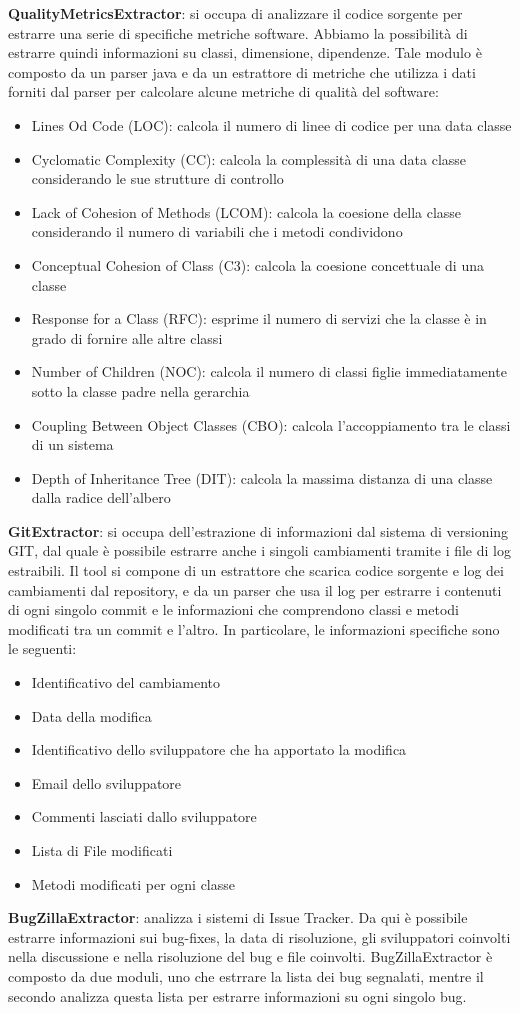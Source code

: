 \textbf{QualityMetricsExtractor}: si occupa di analizzare il codice sorgente per estrarre una serie di specifiche metriche software. Abbiamo la possibilità di estrarre quindi informazioni su classi, dimensione, dipendenze. Tale modulo è composto da un parser java e da un estrattore di metriche che utilizza i dati forniti dal parser per calcolare alcune metriche di qualità del software:
\begin{itemize}
\item Lines Od Code (LOC): calcola il numero di linee di codice per una data classe
\item Cyclomatic Complexity (CC): calcola la complessità di una data classe considerando le sue strutture di controllo
\item Lack of Cohesion of Methods (LCOM): calcola la coesione della classe considerando il numero di variabili che i metodi condividono
\item Conceptual Cohesion of Class (C3): calcola la coesione concettuale di una classe
\item Response for a Class (RFC): esprime il numero di servizi che la classe è in grado di fornire alle altre classi
\item Number of Children (NOC): calcola il numero di classi figlie immediatamente sotto la classe padre nella gerarchia
\item Coupling Between Object Classes (CBO): calcola l'accoppiamento tra le classi di un sistema
\item Depth of Inheritance Tree (DIT): calcola la massima distanza di una classe dalla radice dell'albero
\end{itemize}

\textbf{GitExtractor}: si occupa dell'estrazione di informazioni dal sistema di versioning GIT, dal quale è possibile estrarre anche i singoli cambiamenti tramite i file di log estraibili. Il tool si compone di un estrattore che scarica codice sorgente e log dei cambiamenti dal repository, e da un parser che usa il log per estrarre i contenuti di ogni singolo commit e le informazioni che comprendono classi e metodi modificati tra un commit e l'altro. In particolare, le informazioni specifiche sono le seguenti:
\begin{itemize}
\item Identificativo del cambiamento
\item Data della modifica
\item Identificativo dello sviluppatore che ha apportato la modifica
\item Email dello sviluppatore
\item Commenti lasciati dallo sviluppatore
\item Lista di File modificati
\item Metodi modificati per ogni classe
\end{itemize}

\textbf{BugZillaExtractor}: analizza i sistemi di Issue Tracker. Da qui è possibile estrarre informazioni sui bug-fixes, la data di risoluzione, gli sviluppatori coinvolti nella discussione e nella risoluzione del bug e file coinvolti. BugZillaExtractor è composto da due moduli, uno che estrrare la lista dei bug segnalati, mentre il secondo analizza questa lista per estrarre informazioni su ogni singolo bug.